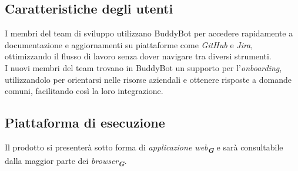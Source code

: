 \subsection{Caratteristiche degli utenti}
I membri del team di sviluppo utilizzano BuddyBot per accedere rapidamente a documentazione e aggiornamenti su piattaforme come 
\emph{GitHub} e \emph{Jira}, ottimizzando il flusso di lavoro senza dover navigare tra diversi strumenti.\\
I nuovi membri del team trovano in BuddyBot un supporto per l'\emph{onboarding}, utilizzandolo per 
orientarsi nelle risorse aziendali e ottenere risposte a domande comuni, facilitando così la loro integrazione.

\subsection{Piattaforma di esecuzione}
Il prodotto si presenterà sotto forma di \emph{applicazione web}\textsubscript{\textit{\textbf{G}}} e sarà consultabile dalla maggior
parte dei \emph{browser}\textsubscript{\textit{\textbf{G}}}.